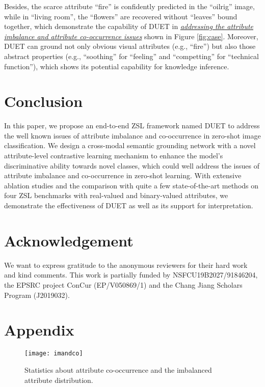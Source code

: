 \documentclass[letterpaper]{article} \usepackage{aaai23}  \usepackage{times}  \usepackage{helvet}  \usepackage{courier}  \usepackage[hyphens]{url}  \usepackage{graphicx} \urlstyle{rm} \def\UrlFont{\rm}  \usepackage{natbib}  \usepackage{caption} \frenchspacing  \setlength{\pdfpagewidth}{8.5in}  \setlength{\pdfpageheight}{11in}  \usepackage{algorithm}
\newcommand{\fy}[1]{{\color{black}#1}}
\begin{document}
Besides, the scarce attribute ``fire'' is confidently predicted in the ``oilrig'' image, 
\fy{while} in ``living room''\fy{,} the ``flowers'' \fy{are} recovered without ``leaves'' bound together, which demonstrate the 
{capability of DUET in \ul{\emph{addressing the attribute imbalance and attribute co-occurrence issues}} shown in Figure \ref{fig:case}.} 
Moreover, DUET can ground not only obvious visual attributes (e.g., ``fire'') but also those abstract properties (e.g., ``soothing'' for ``feeling'' and ``competting'' for ``technical function''), which 
{shows its potential capability}
for {knowledge inference}.

\section{Conclusion}
In this paper, we propose {an end-to-end ZSL framework named} DUET to address the well known issues of attribute imbalance and co-occurrence in zero-shot image classification. We design a cross-modal semantic grounding network with a novel attribute-level contrastive learning mechanism to enhance {the} model's discriminative ability toward{s} novel classes, which could well address the issues of attribute imbalance and co-occurrence in zero-shot learning.
{With extensive ablation studies and the comparison with quite a few state-of-the-art methods on four ZSL benchmarks with real-valued and binary-valued attributes, we demonstrate the effectiveness of DUET as well as its support for interpretation.}


\section*{Acknowledgement}
We want to express gratitude to the anonymous reviewers for their hard work and kind comments. This work is partially funded by NSFCU19B2027/91846204, the EPSRC project ConCur (EP/V050869/1) and the Chang Jiang Scholars
Program (J2019032).



\clearpage

\appendix
\section{Appendix}
\begin{figure*}[htbp]
  \centering
  \texttt{[image: imandco]}
   \vspace{-5pt}
  \caption{{Statistics about attribute co-occurrence and the imbalanced attribute distribution.}
\vspace{-15pt}
  }
  \label{fig:imandco}
\end{figure*}
\end{document}
